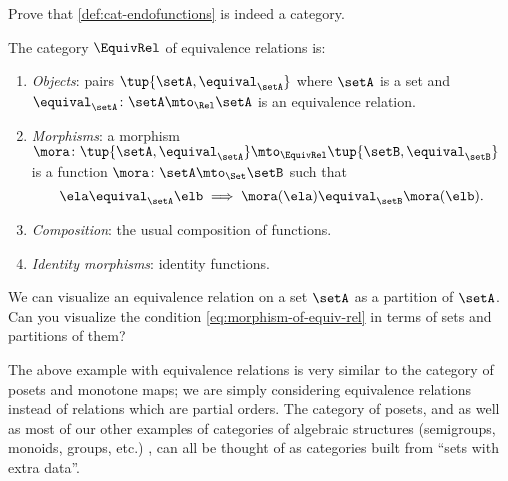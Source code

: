 \begin{exercise}
    Prove that \cref{def:cat-endofunctions} is indeed a category.
\end{exercise}

\begin{solution}
\end{solution}

\begin{ctdefinition}
    \label{def:cat-equivalence-relations}
    The category $\EquivRel$ of equivalence relations is:
    \begin{enumerate}
        \item \emph{Objects}: pairs $\tup{\setA, \equival_{\setA}}$ where $\setA$ is a set and $\equival_{\setA} \colon \setA \mto_{\Rel} \setA$ is an equivalence relation.
        \item \emph{Morphisms}: a morphism $\mora \colon \tup{\setA, \equival_{\setA}} \mto_{\EquivRel} \tup{\setB, \equival_{\setB}}$ is a function $\mora \colon \setA \mto_{\Set} \setB$ such that
              \begin{equation}\label{eq:morphism-of-equiv-rel}
                  \ela \equival_\setA \elb \implies \mora(\ela) \equival_\setB \mora(\elb).
              \end{equation}
        \item \emph{Composition}: the usual composition of functions.
        \item \emph{Identity morphisms}: identity functions.
    \end{enumerate}
\end{ctdefinition}

\begin{exercise}
    We can visualize an equivalence relation on a set $\setA$ as a partition of $\setA$.
    Can you visualize the condition \cref{eq:morphism-of-equiv-rel} in terms of sets and partitions of them?
\end{exercise}

\begin{solution}
\end{solution}

\begin{remark}
    The above example with equivalence relations is very similar to the category of posets and monotone maps; we are simply considering equivalence relations instead of relations which are partial orders.
    The category of posets, and as well as most of our other examples of categories of algebraic structures (semigroups, monoids, groups, etc.)
    , can all be thought of as categories built from ``sets with extra data''.
\end{remark}

